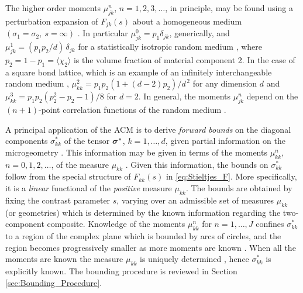 \documentclass{cmslatex}
\newcommand\bsig{\mbox{\boldmath${\sigma}$}}
\begin{document}
The higher order moments $\mu_{jk}^n$, $n=1,2,3,\ldots$, in principle, may be
found using a perturbation expansion of $F_{jk}(s)$ about a
homogeneous medium $(\sigma_1=\sigma_2, \ s=\infty)$ \cite{Golden:CMP-473}. In
particular $\mu_{jk}^0=p_1\delta_{jk}$, generically, and $\mu_{jk}^1=(p_1p_2/d)\,\delta_{jk}$
for a statistically isotropic random medium 
\cite{Golden:CMP-473,Golden:IMA-97,Bruno:JSP-365}, where
$p_2=1-p_1=\langle\chi_2\rangle$ is the volume fraction of material component 2. In
the case of a square bond lattice, which is an example of an
infinitely interchangeable random medium \cite{Bruno:JSP-365},
$\mu_{kk}^2=p_1p_2(1+(d-2)p_2)/d^{\,2}$ for any dimension $d$ and
$\mu_{kk}^3=p_1p_2(p_2^2-p_2-1)/8$ for $d=2$. In general, the moments
$\mu_{jk}^n$ depend on the $(n+1)$-point correlation functions of the
random medium \cite{Golden:CMP-473,Bruno:JSP-365}.




A principal application of the ACM is to derive \emph{forward bounds}
on the diagonal components $\sigma_{kk}^*$ of the tensor $\bsig^*$,
$k=1,\ldots,d$, given partial information on the microgeometry
\cite{Bergman:PRL-1285,Milton:APL-300,Golden:CMP-473,Bergman:AP-78}. This
information may be given in terms of the moments $\mu_{kk}^n$,
$n=0,1,2,\ldots$, of the measure $\mu_{kk}$
\cite{Milton:JAP-5294,Golden:CMP-473}. Given this information, the 
bounds on $\sigma_{kk}^*$ follow from the special structure of $F_{kk}(s)$
in \eqref{eq:Stieltjes_F}. More specifically, it is a \emph{linear}
functional of the \emph{positive} measure $\mu_{kk}$.  The bounds are
obtained by fixing the contrast parameter $s$, varying over an
admissible set of measures $\mu_{kk}$ (or geometries) which is
determined by the known information regarding the two-component
composite.  Knowledge of the moments $\mu_{kk}^n$  for $n=1,\ldots,J$ confines
$\sigma_{kk}^*$ to a region of the complex plane which is bounded by arcs
of circles, and the region becomes progressively smaller as more
moments are known \cite{Milton:JAP-5294,Golden:JMPS-333}. When 
all the moments are known the measure $\mu_{kk}$ is uniquely determined 
\cite{Akhiezer:Book:1965}, hence  $\sigma_{kk}^*$ is explicitly known. The
bounding procedure is reviewed in Section
\ref{sec:Bounding_Procedure}.
\end{document}
